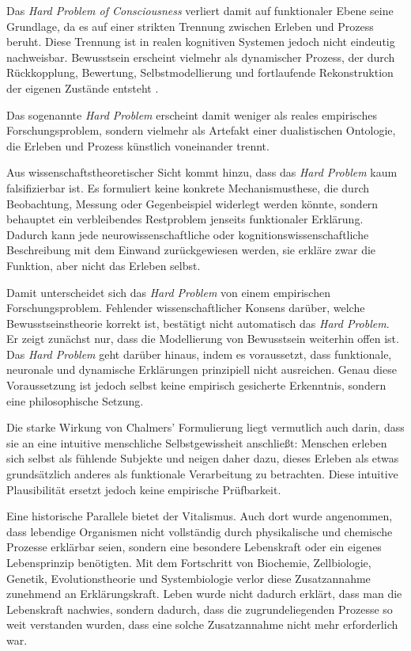 Das \emph{Hard Problem of Consciousness} verliert damit auf funktionaler Ebene seine Grundlage, da es auf einer strikten Trennung zwischen Erleben und Prozess beruht. Diese Trennung ist in realen kognitiven Systemen jedoch nicht eindeutig nachweisbar. Bewusstsein erscheint vielmehr als dynamischer Prozess, der durch Rückkopplung, Bewertung, Selbstmodellierung und fortlaufende Rekonstruktion der eigenen Zustände entsteht \cite{Friston2010,Metzinger2003}.

Das sogenannte \textit{Hard Problem} erscheint damit weniger als reales empirisches Forschungsproblem, sondern vielmehr als Artefakt einer dualistischen Ontologie, die Erleben und Prozess künstlich voneinander trennt.

Aus wissenschaftstheoretischer Sicht kommt hinzu, dass das \textit{Hard Problem} kaum falsifizierbar ist. Es formuliert keine konkrete Mechanismusthese, die durch Beobachtung, Messung oder Gegenbeispiel widerlegt werden könnte, sondern behauptet ein verbleibendes Restproblem jenseits funktionaler Erklärung. Dadurch kann jede neurowissenschaftliche oder kognitionswissenschaftliche Beschreibung mit dem Einwand zurückgewiesen werden, sie erkläre zwar die Funktion, aber nicht das Erleben selbst.

Damit unterscheidet sich das \textit{Hard Problem} von einem empirischen Forschungsproblem. Fehlender wissenschaftlicher Konsens darüber, welche Bewusstseinstheorie korrekt ist, bestätigt nicht automatisch das \textit{Hard Problem}. Er zeigt zunächst nur, dass die Modellierung von Bewusstsein weiterhin offen ist. Das \textit{Hard Problem} geht darüber hinaus, indem es voraussetzt, dass funktionale, neuronale und dynamische Erklärungen prinzipiell nicht ausreichen. Genau diese Voraussetzung ist jedoch selbst keine empirisch gesicherte Erkenntnis, sondern eine philosophische Setzung.

Die starke Wirkung von Chalmers' Formulierung liegt vermutlich auch darin, dass sie an eine intuitive menschliche Selbstgewissheit anschließt: Menschen erleben sich selbst als fühlende Subjekte und neigen daher dazu, dieses Erleben als etwas grundsätzlich anderes als funktionale Verarbeitung zu betrachten. Diese intuitive Plausibilität ersetzt jedoch keine empirische Prüfbarkeit.

Eine historische Parallele bietet der Vitalismus. Auch dort wurde angenommen, dass lebendige Organismen nicht vollständig durch physikalische und chemische Prozesse erklärbar seien, sondern eine besondere Lebenskraft oder ein eigenes Lebensprinzip benötigten. Mit dem Fortschritt von Biochemie, Zellbiologie, Genetik, Evolutionstheorie und Systembiologie verlor diese Zusatzannahme zunehmend an Erklärungskraft. Leben wurde nicht dadurch erklärt, dass man die Lebenskraft nachwies, sondern dadurch, dass die zugrundeliegenden Prozesse so weit verstanden wurden, dass eine solche Zusatzannahme nicht mehr erforderlich war.

